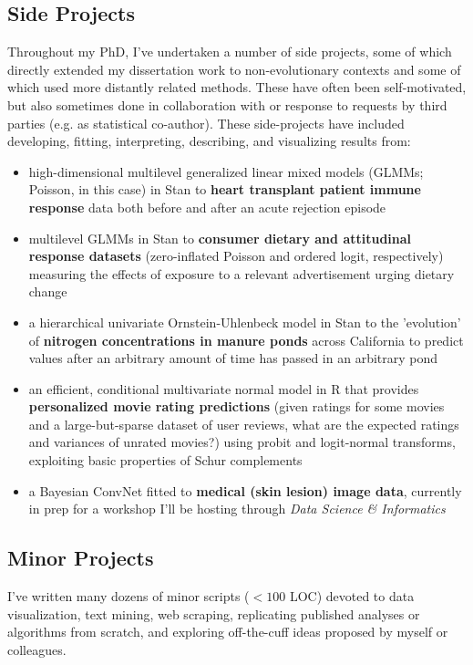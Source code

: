 \documentclass[12pt]{article}
\begin{document}
\subsection{Side Projects}

Throughout my PhD, I've undertaken a number of side projects, some of which directly extended my dissertation work to non-evolutionary contexts and some of which used more distantly related methods. These have often been self-motivated, but also sometimes done in collaboration with or response to requests by third parties (e.g. as statistical co-author). These side-projects have included developing, fitting,  interpreting, describing, and visualizing results from:

\begin{itemize}[noitemsep]

\item high-dimensional multilevel generalized linear mixed models (GLMMs; Poisson, in this case) in Stan to \textbf{heart transplant patient immune response} data both before and after an acute rejection episode
\item multilevel GLMMs in Stan to \textbf{consumer dietary and attitudinal response datasets} (zero-inflated Poisson and ordered logit, respectively) measuring the effects of exposure to a relevant advertisement urging dietary change
\item a hierarchical univariate Ornstein-Uhlenbeck model in Stan to the 'evolution' of \textbf{nitrogen concentrations in manure ponds} across California to predict values after an arbitrary amount of time has passed in an arbitrary pond
\item an efficient, conditional multivariate normal model in R that provides \textbf{personalized movie rating predictions} (given ratings for some movies and a large-but-sparse dataset of user reviews, what are the expected ratings and variances of unrated movies?) using probit and logit-normal transforms, exploiting basic properties of Schur complements
\item a Bayesian ConvNet fitted to \textbf{medical (skin lesion) image data}, currently in prep for a workshop I'll be hosting through \emph{Data Science \& Informatics}

\end{itemize}

\subsection{Minor Projects}
I've written many dozens of minor scripts ($<100$ LOC) devoted to data visualization, text mining, web scraping, replicating published analyses or algorithms from scratch, and exploring off-the-cuff ideas proposed by myself or colleagues.
\end{document}
